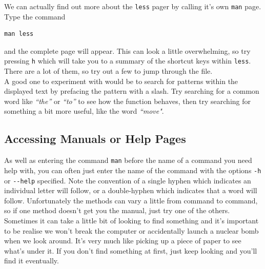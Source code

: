 \begin{bonus}
We can actually find out more about the \texttt{less} pager by calling it's own \texttt{man} page.
Type the command \\
\begin{lstlisting}
man less
\end{lstlisting}
 and the complete page will appear.
This can look a little overwhelming, so try pressing \texttt{h} which will take you to a summary of the shortcut keys within \texttt{less}.
There are a lot of them, so try out a few to jump through the file. \\

A good one to experiment with would be to search for patterns within the displayed text by prefacing the pattern with a slash.
Try searching for a common word like \textit{``the''} or \textit{``to''} to see how the function behaves, then try searching for something a bit more useful, like the word \textit{``move"}. \\
\end{bonus}

\subsection{Accessing Manuals or Help Pages}
\begin{information}
As well as entering the command \texttt{man} before the name of a command you need help with, you can often just enter the name of the command with the options \texttt{-h} or \texttt{-{}-help} specified.
Note the convention of a single hyphen which indicates an individual letter will follow, or a double-hyphen which indicates that a word will follow.
Unfortunately the methods can vary a little from command to command, so if one method doesn't get you the manual, just try one of the others.\\

Sometimes it can take a little bit of looking to find something and it's important to be realise we won't break the computer or accidentally launch a nuclear bomb when we look around.
It's very much like picking up a piece of paper to see what's under it.
If you don't find something  at first, just keep looking and you'll find it eventually.\\
\end{information}

